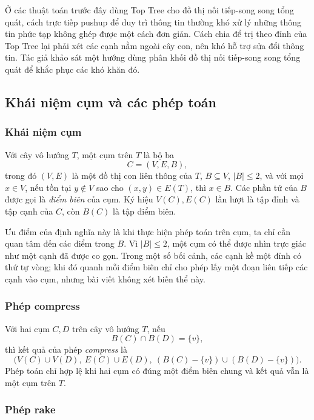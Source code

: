\documentclass[11pt]{article}
\begin{document}
Ở các thuật toán trước đây dùng Top Tree cho đồ thị nối tiếp-song song tổng
quát, cách trực tiếp pushup để duy trì thông tin thường khó xử lý những thông
tin phức tạp không ghép được một cách đơn giản. Cách chia để trị theo đỉnh của
Top Tree lại phải xét các cạnh nằm ngoài cây con, nên khó hỗ trợ sửa đổi thông
tin. Tác giả khảo sát một hướng dùng phân khối đồ thị nối tiếp-song song tổng
quát để khắc phục các khó khăn đó.

\subsection{Khái niệm cụm và các phép toán}

\subsubsection{Khái niệm cụm}

Với cây vô hướng \(T\), một cụm trên \(T\) là bộ ba
\[
  C=(V,E,B),
\]
trong đó \((V,E)\) là một đồ thị con liên thông của \(T\),
\(B\subseteq V\), \(|B|\le 2\), và với mọi \(x\in V\), nếu tồn tại
\(y\notin V\) sao cho \((x,y)\in E(T)\), thì \(x\in B\). Các phần tử của
\(B\) được gọi là \emph{điểm biên} của cụm. Ký hiệu \(V(C),E(C)\) lần lượt là
tập đỉnh và tập cạnh của \(C\), còn \(B(C)\) là tập điểm biên.

Ưu điểm của định nghĩa này là khi thực hiện phép toán trên cụm, ta chỉ cần quan
tâm đến các điểm trong \(B\). Vì \(|B|\le 2\), một cụm có thể được nhìn trực
giác như một cạnh đã được co gọn. Trong một số bối cảnh, các cạnh kề một đỉnh
có thứ tự vòng; khi đó quanh mỗi điểm biên chỉ cho phép lấy một đoạn liên tiếp
các cạnh vào cụm, nhưng bài viết không xét biến thể này.

\subsubsection{Phép compress}

Với hai cụm \(C,D\) trên cây vô hướng \(T\), nếu
\[
  B(C)\cap B(D)=\{v\},
\]
thì kết quả của phép \emph{compress} là
\[
  \bigl(V(C)\cup V(D),\ E(C)\cup E(D),\
  (B(C)-\{v\})\cup(B(D)-\{v\})\bigr).
\]
Phép toán chỉ hợp lệ khi hai cụm có đúng một điểm biên chung và kết quả vẫn là
một cụm trên \(T\).

\subsubsection{Phép rake}
\end{document}
